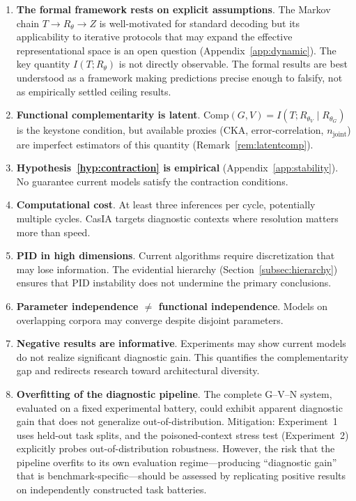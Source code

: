 \documentclass[11pt,a4paper]{article}
\theoremstyle{definition}
\newcommand{\Rtheta}{R_\theta}
\newcommand{\thetaG}{\theta_G}
\newcommand{\thetaV}{\theta_V}
\begin{document}
\begin{enumerate}[leftmargin=*,itemsep=3pt]
\item \textbf{The formal framework rests on explicit assumptions}. The Markov chain $T \to \Rtheta \to Z$ is well-motivated for standard decoding but its applicability to iterative protocols that may expand the effective representational space is an open question (Appendix~\ref{app:dynamic}). The key quantity $I(T; \Rtheta)$ is not directly observable. The formal results are best understood as a framework making predictions precise enough to falsify, not as empirically settled ceiling results.
\item \textbf{Functional complementarity is latent}. $\mathrm{Comp}(G,V) = I(T; R_{\thetaV} \mid R_{\thetaG})$ is the keystone condition, but available proxies (CKA, error-correlation, $n_\text{joint}$) are imperfect estimators of this quantity (Remark~\ref{rem:latentcomp}).
\item \textbf{Hypothesis~\ref{hyp:contraction} is empirical} (Appendix~\ref{app:stability}). No guarantee current models satisfy the contraction conditions.
\item \textbf{Computational cost}. At least three inferences per cycle, potentially multiple cycles. CasIA targets diagnostic contexts where resolution matters more than speed.
\item \textbf{PID in high dimensions}. Current algorithms require discretization that may lose information. The evidential hierarchy (Section~\ref{subsec:hierarchy}) ensures that PID instability does not undermine the primary conclusions.
\item \textbf{Parameter independence $\neq$ functional independence}. Models on overlapping corpora may converge despite disjoint parameters.
\item \textbf{Negative results are informative}. Experiments may show current models do not realize significant diagnostic gain. This quantifies the complementarity gap and redirects research toward architectural diversity.
\item \textbf{Overfitting of the diagnostic pipeline}. The complete G--V--N system, evaluated on a fixed experimental battery, could exhibit apparent diagnostic gain that does not generalize out-of-distribution. Mitigation: Experiment~1 uses held-out task splits, and the poisoned-context stress test (Experiment~2) explicitly probes out-of-distribution robustness. However, the risk that the pipeline overfits to its own evaluation regime---producing ``diagnostic gain'' that is benchmark-specific---should be assessed by replicating positive results on independently constructed task batteries.

\end{enumerate}
\end{document}
